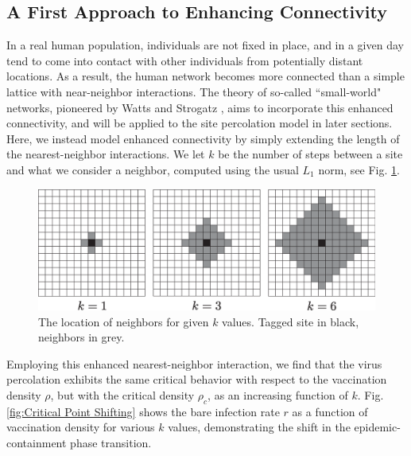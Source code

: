 \documentclass{article}
\begin{document}
\subsection{A First Approach to Enhancing Connectivity}

In a real human population, individuals are not fixed in place, and in a given day tend to come into contact with other individuals from potentially distant locations. As a result, the human network becomes more connected than a simple lattice with near-neighbor interactions. The theory of so-called ``small-world" networks, pioneered by Watts and Strogatz \cite{WattsStrogatz}, aims to incorporate this enhanced connectivity, and will be applied to the site percolation model in later sections. Here, we instead model enhanced connectivity by simply extending the length of the nearest-neighbor interactions. We let $k$ be the number of steps between a site and what we consider a neighbor, computed using the usual $L_{1}$ norm, see Fig. \ref{fig:L1 norm}.

\begin{figure}[H]
\centering
\includegraphics[scale=0.4]{figs/L1norm.eps}
\caption{The location of neighbors for given $k$ values. Tagged site in black, neighbors in grey. }
\label{fig:L1 norm}
\end{figure}

Employing this enhanced nearest-neighbor interaction, we find that the virus percolation exhibits the same critical behavior with respect to the vaccination density $\rho$, but with the critical density $\rho_{c}$, as an increasing function of $k$. Fig. \ref{fig:Critical Point Shifting} shows the bare infection rate $r$ as a function of vaccination density for various $k$ values, demonstrating the shift in the epidemic-containment phase transition.  
\end{document}
